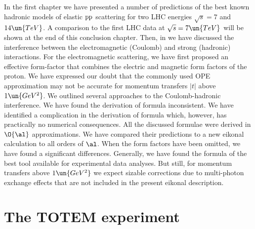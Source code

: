 



In the first chapter we have presented a number of predictions of the best known hadronic models of elastic $\rm pp$ scattering for two LHC energies $\sqrt s = 7$ and $14\un{TeV}$. A comparison to the first LHC data at $\sqrt s = 7\un{TeV}$ will be shown at the end of this conclusion chapter. Then, in  we have discussed the interference between the electromagnetic (Coulomb) and strong (hadronic) interactions. For the electromagnetic scattering, we have first proposed an effective form-factor that combines the electric and magnetic form factors of the proton. We have expressed our doubt that the commonly used OPE approximation may not be accurate for momentum transfers $|t|$ above $1\un{GeV^2}$. We outlined several approaches to the Coulomb-hadronic interference. We have found the derivation of \WaY{} formula inconsistent. We have identified a complication in the derivation of \KaL{} formula which, however, has practically no numerical consequences. All the discussed formulae were derived in $\O{\al}$ approximations. We have compared their predictions to a new eikonal calculation to all orders of $\al$. When the form factors have been omitted, we have found a significant differences. Generally, we have found the formula of \KaL{} the best tool available for experimental data analyses. But still, for momentum transfers above $1\un{GeV^2}$ we expect sizable corrections due to multi-photon exchange effects that are not included in the present eikonal description.


\chapter[ttm]{The TOTEM experiment}

